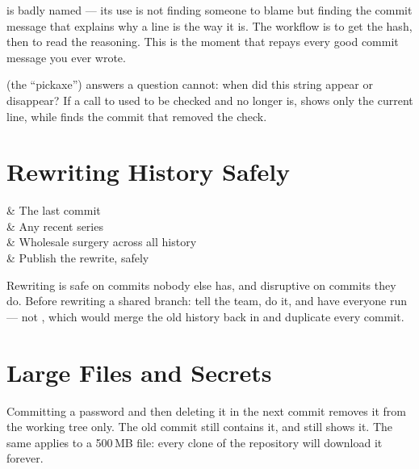 \begin{note}
	 is badly named --- its use is not finding someone to blame but
	finding the commit message that explains why a line is the way it is. The
	workflow is  to get the hash, then  to read the
	reasoning. This is the moment that repays every good commit message you ever
	wrote.
\end{note}

\begin{note}
	 (the ``pickaxe'') answers a question  cannot: when
	did this string appear or disappear? If a call to  used to be
	checked and no longer is,  shows only the current line, while
	 finds the commit that removed the check.
\end{note}

\section{Rewriting History Safely}\label{sec:git-rewrite}

\begin{keys}[0.34]
	          & The last commit                              \\
	          & Any recent series                            \\
	               & Wholesale surgery across all history         \\
	 & Publish the rewrite, safely                  \\
\end{keys}

\begin{moral}
	Rewriting is safe on commits nobody else has, and disruptive on commits they
	do. Before rewriting a shared branch: tell the team, do it, and have everyone
	run  --- not ,
	which would merge the old history back in and duplicate every commit.
\end{moral}

\section{Large Files and Secrets}\label{sec:git-bigfiles}

\begin{note}
	Committing a password and then deleting it in the next commit removes it from
	the working tree only. The old commit still contains it, and
	 still shows it. The same applies to a 500\,MB file: every
	clone of the repository will download it forever.
\end{note}

